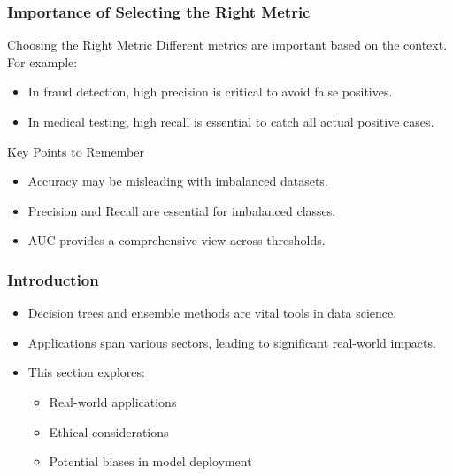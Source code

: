 \documentclass[aspectratio=169]{beamer}
\begin{document}
\begin{frame}[fragile]
    \frametitle{Importance of Selecting the Right Metric}
    \begin{block}{Choosing the Right Metric}
        Different metrics are important based on the context. For example:
        \begin{itemize}
            \item In fraud detection, high precision is critical to avoid false positives.
            \item In medical testing, high recall is essential to catch all actual positive cases.
        \end{itemize}
    \end{block}

    \begin{block}{Key Points to Remember}
        \begin{itemize}
            \item Accuracy may be misleading with imbalanced datasets.
            \item Precision and Recall are essential for imbalanced classes.
            \item AUC provides a comprehensive view across thresholds.
        \end{itemize}
    \end{block}
\end{frame}

\begin{frame}[fragile]
    \frametitle{Introduction}
    \begin{itemize}
        \item Decision trees and ensemble methods are vital tools in data science.
        \item Applications span various sectors, leading to significant real-world impacts.
        \item This section explores:
        \begin{itemize}
            \item Real-world applications
            \item Ethical considerations
            \item Potential biases in model deployment
        \end{itemize}
    \end{itemize}
\end{frame}
\end{document}
